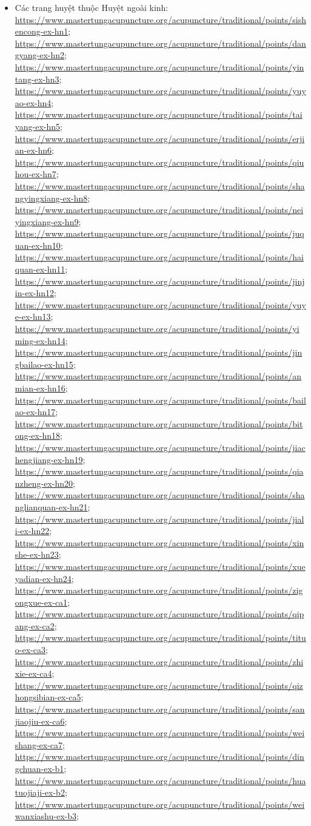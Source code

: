 \documentclass[12pt,a4paper]{article}
\begin{document}
\begin{itemize}
  \item Các trang huyệt thuộc Huyệt ngoài kinh: \url{https://www.mastertungacupuncture.org/acupuncture/traditional/points/sishencong-ex-hn1}; \url{https://www.mastertungacupuncture.org/acupuncture/traditional/points/dangyang-ex-hn2}; \url{https://www.mastertungacupuncture.org/acupuncture/traditional/points/yintang-ex-hn3}; \url{https://www.mastertungacupuncture.org/acupuncture/traditional/points/yuyao-ex-hn4}; \url{https://www.mastertungacupuncture.org/acupuncture/traditional/points/taiyang-ex-hn5}; \url{https://www.mastertungacupuncture.org/acupuncture/traditional/points/erjian-ex-hn6}; \url{https://www.mastertungacupuncture.org/acupuncture/traditional/points/qiuhou-ex-hn7}; \url{https://www.mastertungacupuncture.org/acupuncture/traditional/points/shangyingxiang-ex-hn8}; \url{https://www.mastertungacupuncture.org/acupuncture/traditional/points/neiyingxiang-ex-hn9}; \url{https://www.mastertungacupuncture.org/acupuncture/traditional/points/juquan-ex-hn10}; \url{https://www.mastertungacupuncture.org/acupuncture/traditional/points/haiquan-ex-hn11}; \url{https://www.mastertungacupuncture.org/acupuncture/traditional/points/jinjin-ex-hn12}; \url{https://www.mastertungacupuncture.org/acupuncture/traditional/points/yuye-ex-hn13}; \url{https://www.mastertungacupuncture.org/acupuncture/traditional/points/yiming-ex-hn14}; \url{https://www.mastertungacupuncture.org/acupuncture/traditional/points/jingbailao-ex-hn15}; \url{https://www.mastertungacupuncture.org/acupuncture/traditional/points/anmian-ex-hn16}; \url{https://www.mastertungacupuncture.org/acupuncture/traditional/points/bailao-ex-hn17}; \url{https://www.mastertungacupuncture.org/acupuncture/traditional/points/bitong-ex-hn18}; \url{https://www.mastertungacupuncture.org/acupuncture/traditional/points/jiachengjiang-ex-hn19}; \url{https://www.mastertungacupuncture.org/acupuncture/traditional/points/qianzheng-ex-hn20}; \url{https://www.mastertungacupuncture.org/acupuncture/traditional/points/shanglianquan-ex-hn21}; \url{https://www.mastertungacupuncture.org/acupuncture/traditional/points/jiali-ex-hn22}; \url{https://www.mastertungacupuncture.org/acupuncture/traditional/points/xinshe-ex-hn23}; \url{https://www.mastertungacupuncture.org/acupuncture/traditional/points/xueyadian-ex-hn24}; \url{https://www.mastertungacupuncture.org/acupuncture/traditional/points/zigongxue-ex-ca1}; \url{https://www.mastertungacupuncture.org/acupuncture/traditional/points/qipang-ex-ca2}; \url{https://www.mastertungacupuncture.org/acupuncture/traditional/points/tituo-ex-ca3}; \url{https://www.mastertungacupuncture.org/acupuncture/traditional/points/zhixie-ex-ca4}; \url{https://www.mastertungacupuncture.org/acupuncture/traditional/points/qizhongsibian-ex-ca5}; \url{https://www.mastertungacupuncture.org/acupuncture/traditional/points/sanjiaojiu-ex-ca6}; \url{https://www.mastertungacupuncture.org/acupuncture/traditional/points/weishang-ex-ca7}; \url{https://www.mastertungacupuncture.org/acupuncture/traditional/points/dingchuan-ex-b1}; \url{https://www.mastertungacupuncture.org/acupuncture/traditional/points/huatuojiaji-ex-b2}; \url{https://www.mastertungacupuncture.org/acupuncture/traditional/points/weiwanxiashu-ex-b3}; 
\end{itemize}
\end{document}
